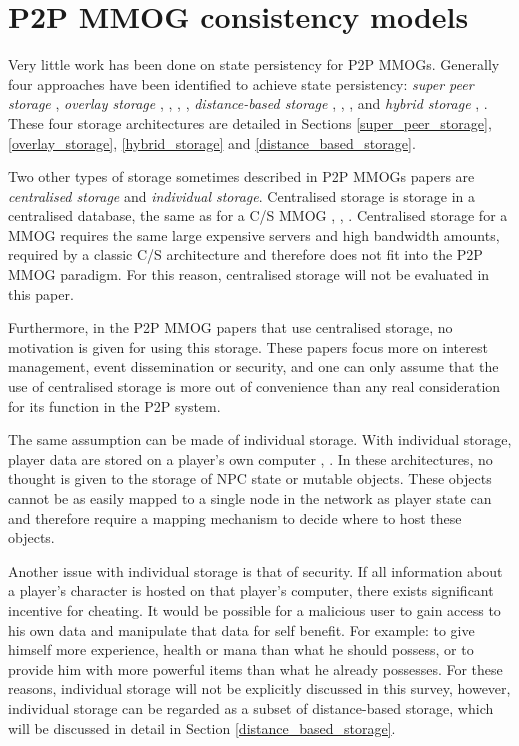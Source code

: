 \documentclass[10pt,a4paper,journal,cspaper,compsoc]{IEEEtran}
\begin{document}
\section{P2P MMOG consistency models}
\label{p2p_mmog_cm_overview}

Very little work has been done on state persistency for P2P MMOGs. Generally four approaches have been identified to achieve state persistency:
\emph{super peer storage} \cite{knutsson_p2p_first}, \emph{overlay storage} \cite{Douglas05enablingmassively}, \cite{using_freenet_storage},
\cite{Fan_phd}, \cite{past_storage_focus}, \emph{distance-based storage} \cite{Buyukkaya_voronoi_state_management}, \cite{Hu_voronoi_IM},
\cite{colyseus_distance_based}, \cite{AtoZ} and \emph{hybrid storage} \cite{zoned_federation}, \cite{hybrid_storage1}. These four storage
architectures are detailed in Sections \ref{super_peer_storage}, \ref{overlay_storage}, \ref{hybrid_storage} and \ref{distance_based_storage}.

Two other types of storage sometimes described in P2P MMOGs papers are \emph{centralised storage} and \emph{individual storage}. Centralised storage
is storage in a centralised database, the same as for a C/S MMOG \cite{badumna_engine}, \cite{rooney_centralised_storage},
\cite{hybrid_p2p_cs_centralised}. Centralised storage for a MMOG requires the same large expensive servers and high bandwidth amounts, required by a
classic C/S architecture and therefore does not fit into the P2P MMOG paradigm. For this reason, centralised storage will not be evaluated in this
paper.

Furthermore, in the P2P MMOG papers that use centralised storage, no motivation is given for using this storage. These papers focus more on interest
management, event dissemination or security, and one can only assume that the use of centralised storage is more out of convenience than any real
consideration for its function in the P2P system.

The same assumption can be made of individual storage. With individual storage, player data are stored on a player's own computer
\cite{individual_storage1}, \cite{cheat_proof_playout}. In these architectures, no thought is given to the storage of NPC state or mutable objects.
These objects cannot be as easily mapped to a single node in the network as player state can and therefore require a mapping mechanism to decide
where to host these objects.

Another issue with individual storage is that of security. If all information about a player's character is hosted on that player's computer, there
exists significant incentive for cheating. It would be possible for a malicious user to gain access to his own data and manipulate that data for self
benefit. For example: to give himself more experience, health or mana than what he should possess, or to provide him with more powerful items than
what he already possesses. For these reasons, individual storage will not be explicitly discussed in this survey, however, individual storage can be
regarded as a subset of distance-based storage, which will be discussed in detail in Section \ref{distance_based_storage}.
\end{document}
